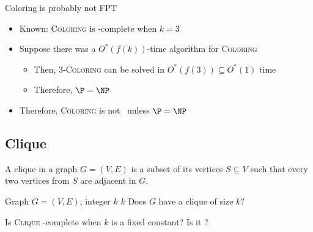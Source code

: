 \begin{frame}{Coloring is probably not FPT}
 \begin{itemize}
  \item Known: \textsc{Coloring} is \NP-complete when $k=3$
  \item Suppose there was a $O^*(f(k))$-time algorithm for \textsc{Coloring}
  \begin{itemize}
   \item Then, 3-\textsc{Coloring} can be solved in $O^*(f(3)) \subseteq O^*(1)$ time
   \item Therefore, $\P = \NP$
  \end{itemize}
  \item Therefore, \textsc{Coloring} is not \FPT\ unless $\P=\NP$
 \end{itemize}
\end{frame}

\subsection{Clique}

\begin{frame}

 A \alert{clique} in a graph $G=(V,E)$ is a subset of its vertices $S\subseteq V$ such that every two vertices from $S$ are adjacent in $G$.
 
  {Graph $G=(V,E)$, integer $k$}
  {$k$}
  {Does $G$ have a clique of size $k$?}
 
\begin{center}
\end{center}

\noindent
Is \textsc{Clique} \NP-complete when $k$ is a fixed constant? Is it \FPT?
\end{frame}



